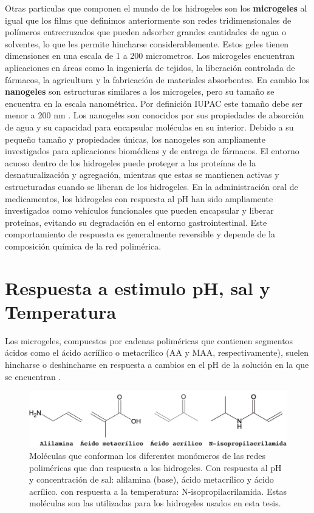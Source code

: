 Otras particulas que componen el mundo de los hidrogeles son los \textbf{microgeles} al igual que los films que definimos anteriormente son redes tridimensionales de pol\'imeros entrecruzados que pueden adsorber grandes cantidades de agua o solventes, lo que les permite hincharse considerablemente. Estos geles tienen dimensiones en una escala de 1 a 200 micrometros. Los microgeles encuentran aplicaciones en \'areas como la ingenier\'ia de tejidos, la liberaci\'on controlada de f\'armacos, la agricultura y la fabricaci\'on de materiales absorbentes. 
En cambio los  \textbf{nanogeles} son estructuras similares a los microgeles, pero su tama\~no se encuentra en la escala nanom\'etrica. Por definici\'on IUPAC este tama\~no debe ser menor a 200 nm \addcite. Los nanogeles son conocidos por sus propiedades de absorci\'on de agua y su capacidad para encapsular mol\'eculas en su interior. Debido a su peque\~no tama\~no y propiedades \'unicas, los nanogeles son ampliamente investigados para aplicaciones biom\'edicas y de entrega de f\'armacos. %
El entorno acuoso dentro de los hidrogeles puede proteger a las prote\'inas de la desnaturalizaci\'on y agregaci\'on, mientras que estas se mantienen activas y estructuradas cuando se liberan de los hidrogeles. 
En la administraci\'on oral de medicamentos, los hidrogeles con respuesta al pH han sido ampliamente investigados como veh\'iculos funcionales que pueden encapsular y liberar prote\'inas, evitando su degradaci\'on en el entorno gastrointestinal.
Este comportamiento de respuesta es  generalmente reversible y depende de la composici\'on qu\'imica de la red polim\'erica.


\section{Respuesta a estimulo pH, sal y Temperatura}

Los microgeles, compuestos por cadenas polim\'ericas que contienen segmentos \'acidos como el \'acido acrí\'ilico o metacr\'ilico (AA y MAA, respectivamente), suelen hincharse o deshincharse en respuesta a cambios en el pH de la soluci\'on en la que se encuentran  \cite{snowden1996colloidal}.

\begin{figure}[!tb]
	\centering
	\includegraphics[width=0.9\linewidth]{Figures/modelos/acidos.pdf}
	\caption{Mol\'eculas  que conforman los diferentes mon\'omeros de las redes polim\'ericas que dan respuesta a los hidrogeles. Con respuesta al pH y concentraci\'on de sal: alilamina (base),  \'acido metacr\'ilico y \'acido acr\'ilico. con respuesta a la temperatura: N-isopropilacrilamida.
	Estas mol\'eculas son las utilizadas para los hidrogeles usados en esta tesis.}
	\label{fig:intro:acidos-aa-maa}
\end{figure}


